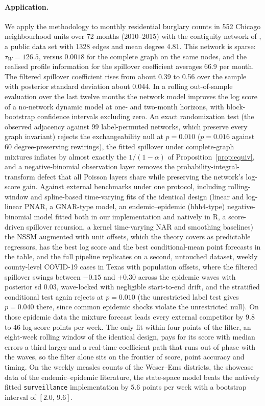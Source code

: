 \documentclass[12pt]{article}
\theoremstyle{plain}
\theoremstyle{definition}
\theoremstyle{remark}
\newcommand{\tauW}{\tau_W}
\newcommand{\NumRegions}{552}
\newcommand{\NumMonths}{72}
\newcommand{\NumEdges}{1328}
\newcommand{\DegMean}{4.81}
\newcommand{\TauW}{126.5}
\newcommand{\TauWc}{0.0018}
\newcommand{\InfoNetMean}{66.9}
\newcommand{\BetaOneFirst}{0.39}
\newcommand{\BetaOneLast}{0.56}
\newcommand{\SdBetaOneMean}{0.044}
\begin{document}
\paragraph{Application.} We apply the methodology to monthly residential burglary counts in \NumRegions{} Chicago neighbourhood units over \NumMonths{} months (2010--2015) with the contiguity network of \citet{clark2021class}, a public data set with \NumEdges{} edges and mean degree \DegMean. This network is sparse: $\tauW=\TauW$, versus $\TauWc$ for the complete graph on the same nodes, and the realised profile information for the spillover coefficient averages \InfoNetMean{} per month. The filtered spillover coefficient rises from about \BetaOneFirst{} to \BetaOneLast{} over the sample with posterior standard deviation about \SdBetaOneMean. In a rolling out-of-sample evaluation over the last twelve months the network model improves the log score of a no-network dynamic model at one- and two-month horizons, with block-bootstrap confidence intervals excluding zero. An exact randomization test (the observed adjacency against $99$ label-permuted networks, which preserve every graph invariant) rejects the exchangeability null at $p=0.010$ ($p=0.016$ against $60$ degree-preserving rewirings), the fitted spillover under complete-graph mixtures inflates by almost exactly the $1/(1-\alpha)$ of Proposition~\ref{prop:equiv}, and a negative-binomial observation layer removes the probability-integral-transform defect that all Poisson layers share while preserving the network's log-score gain. Against external benchmarks under one protocol, including rolling-window and spline-based time-varying fits of the identical design (linear and log-linear PNAR, a GNAR-type model, an endemic--epidemic (hhh4-type) negative-binomial model fitted both in our implementation and natively in R, a score-driven spillover recursion, a kernel time-varying NAR and smoothing baselines) the NSSM augmented with unit offsets, which the theory covers as predictable regressors, has the best log score and the best conditional-mean point forecasts in the table, and the full pipeline replicates on a second, untouched dataset, weekly county-level COVID-19 cases in Texas with population offsets, where the filtered spillover swings between $-0.15$ and $+0.30$ across the epidemic waves with posterior sd $0.03$, wave-locked with negligible start-to-end drift, and the stratified conditional test again rejects at $p=0.010$ (the unrestricted label test gives $p=0.040$ there, since common epidemic shocks violate the unrestricted null). On those epidemic data the mixture forecast leads every external competitor by $9.8$ to $46$ log-score points per week. The only fit within four points of the filter, an eight-week rolling window of the identical design, pays for its score with median errors a third larger and a real-time coefficient path that runs out of phase with the waves, so the filter alone sits on the frontier of score, point accuracy and timing. On the weekly measles counts of the Weser--Ems districts, the showcase data of the endemic--epidemic literature, the state-space model beats the natively fitted \texttt{surveillance} implementation by $5.6$ points per week with a bootstrap interval of $[2.0,\,9.6]$. 
\end{document}
